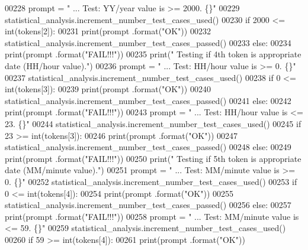 \begin{DoxyCode}
00228         prompt = \textcolor{stringliteral}{"  ... Test: YY/year value is >= 2000.         \{\}"}
00229         statistical\_analysis.increment\_number\_test\_cases\_used()
00230         \textcolor{keywordflow}{if} 2000 <= int(tokens[2]):
00231             print(prompt .format(\textcolor{stringliteral}{"OK"}))
00232             statistical\_analysis.increment\_number\_test\_cases\_passed()
00233         \textcolor{keywordflow}{else}:
00234             print(prompt .format(\textcolor{stringliteral}{"FAIL!!!"}))
00235         print(\textcolor{stringliteral}{" Testing if 4th token is appropriate date (HH/hour value)."})
00236         prompt = \textcolor{stringliteral}{"  ... Test: HH/hour value is >= 0.            \{\}"}
00237         statistical\_analysis.increment\_number\_test\_cases\_used()
00238         \textcolor{keywordflow}{if} 0 <= int(tokens[3]):
00239             print(prompt .format(\textcolor{stringliteral}{"OK"}))
00240             statistical\_analysis.increment\_number\_test\_cases\_passed()
00241         \textcolor{keywordflow}{else}:
00242             print(prompt .format(\textcolor{stringliteral}{"FAIL!!!"}))
00243         prompt = \textcolor{stringliteral}{"  ... Test: HH/hour value is <= 23.           \{\}"}
00244         statistical\_analysis.increment\_number\_test\_cases\_used()
00245         \textcolor{keywordflow}{if} 23 >= int(tokens[3]):
00246             print(prompt .format(\textcolor{stringliteral}{"OK"}))
00247             statistical\_analysis.increment\_number\_test\_cases\_passed()
00248         \textcolor{keywordflow}{else}:
00249             print(prompt .format(\textcolor{stringliteral}{"FAIL!!!"}))
00250         print(\textcolor{stringliteral}{" Testing if 5th token is appropriate date (MM/minute value)."})
00251         prompt = \textcolor{stringliteral}{"  ... Test: MM/minute value is >= 0.          \{\}"}
00252         statistical\_analysis.increment\_number\_test\_cases\_used()
00253         \textcolor{keywordflow}{if} 0 <= int(tokens[4]):
00254             print(prompt .format(\textcolor{stringliteral}{"OK"}))
00255             statistical\_analysis.increment\_number\_test\_cases\_passed()
00256         \textcolor{keywordflow}{else}:
00257             print(prompt .format(\textcolor{stringliteral}{"FAIL!!!"}))
00258         prompt = \textcolor{stringliteral}{"  ... Test: MM/minute value is <= 59.         \{\}"}
00259         statistical\_analysis.increment\_number\_test\_cases\_used()
00260         \textcolor{keywordflow}{if} 59 >= int(tokens[4]):
00261             print(prompt .format(\textcolor{stringliteral}{"OK"}))

\end{DoxyCode}
